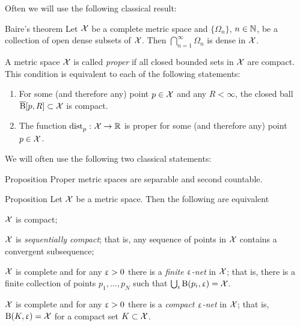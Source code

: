 Often we will use the following classical result:

\begin{thm}{Baire's theorem}
Let $\mathcal{X}$ be a complete metric space 
and $\{\Omega_n\}$, $n\in \NN$, be a collection of open dense subsets of $\mathcal{X}$.
Then $\bigcap_{n=1}^\infty\Omega_n$ is dense in $\mathcal{X}$.
\end{thm}
 

A metric space $\mathcal{X}$ is called \emph{proper} if all closed bounded sets in $\mathcal{X}$ are compact. 
This condition is equivalent to each of the following statements:
\begin{enumerate}
\item For some (and therefore any) point $p\in \spc{X}$ and any $R<\infty$, 
the closed ball $\cBall[p,R]\subset\spc{X}$ is compact. 
\item The function $\distfun{p}{}{}\:\spc{X}\to\RR$ is proper for some (and therefore any) point $p\in \spc{X}$.
\end{enumerate}

We will often use the following two classical statements:

\begin{thm}{Proposition}
Proper metric spaces are separable and second countable.
\end{thm}



\begin{thm}{Proposition}\label{compact=seq-compact}
Let $\mathcal{X}$ be a metric space.
Then the following are equivalent

\begin{subthm}{}
$\mathcal{X}$ is compact;
\end{subthm}

\begin{subthm}{}
$\mathcal{X}$ is \emph{sequentially compact}; that is, any sequence of points in $\mathcal{X}$ contains a convergent subsequence;
\end{subthm}

\begin{subthm}{}
$\mathcal{X}$ is complete and for any $\upvarepsilon>0$ there is a \emph{finite $\upvarepsilon$-net} in $\mathcal{X}$; that is, there is a finite collection of points $p_1,\ldots,p_{N}$ such that $\bigcup_i\mathrm{B}{}(p_i,\upvarepsilon)=\mathcal{X}$.
\end{subthm}

\begin{subthm}{}
$\mathcal{X}$ is complete and for any $\upvarepsilon>0$ there is a {}\emph{compact $\upvarepsilon$-net} in $\mathcal{X}$; that is, $\mathrm{B}{}(K,\upvarepsilon)=\mathcal{X}$ for a compact set $K\subset \spc{X}$.
\end{subthm}

\end{thm}


